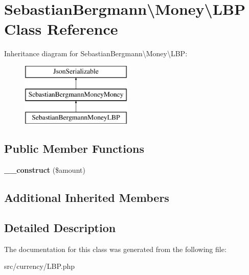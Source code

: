 \hypertarget{classSebastianBergmann_1_1Money_1_1LBP}{}\section{Sebastian\+Bergmann\textbackslash{}Money\textbackslash{}L\+B\+P Class Reference}
\label{classSebastianBergmann_1_1Money_1_1LBP}
Inheritance diagram for Sebastian\+Bergmann\textbackslash{}Money\textbackslash{}L\+B\+P\+:\begin{figure}[H]
\begin{center}
\leavevmode
\includegraphics[height=3.000000cm]{classSebastianBergmann_1_1Money_1_1LBP}
\end{center}
\end{figure}
\subsection*{Public Member Functions}
\begin{DoxyCompactItemize}
\item 
\hypertarget{classSebastianBergmann_1_1Money_1_1LBP_af9186302465259b09f007c5cf8bc4bab}{}{\bfseries \+\_\+\+\_\+construct} (\$amount)\label{classSebastianBergmann_1_1Money_1_1LBP_af9186302465259b09f007c5cf8bc4bab}

\end{DoxyCompactItemize}
\subsection*{Additional Inherited Members}


\subsection{Detailed Description}


The documentation for this class was generated from the following file\+:\begin{DoxyCompactItemize}
\item 
src/currency/L\+B\+P.\+php\end{DoxyCompactItemize}
